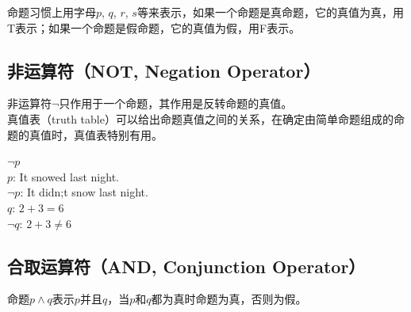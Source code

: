 \documentclass[12pt, openany, oneside]{book}
\begin{document}
命题习惯上用字母$ p $, $ q $, $ r $, $ s $等来表示，如果一个命题是真命题，它的真值为真，用T表示；如果一个命题是假命题，它的真值为假，用F表示。

\subsection{非运算符（NOT, Negation Operator）}

非运算符$ \neg $只作用于一个命题，其作用是反转命题的真值。 \\

真值表（truth table）可以给出命题真值之间的关系，在确定由简单命题组成的命题的真值时，真值表特别有用。

\begin{table}[H]
	\centering
	\caption{NOT真值表}
\end{table}

\begin{tcolorbox}
	$ \neg p $ \\
	$ p $: It snowed last night. \\
	$ \neg p $: It didn;t snow last night. \\
	$ q $: $ 2 + 3 = 6 $ \\
	$ \neg q $: $ 2 + 3 \ne 6 $
\end{tcolorbox}

\subsection{合取运算符（AND, Conjunction Operator）}

命题$ p \wedge q $表示$ p $并且$ q $，当$ p $和$ q $都为真时命题为真，否则为假。

\begin{table}[H]
	\centering
	\caption{AND真值表}
\end{table}
\end{document}
